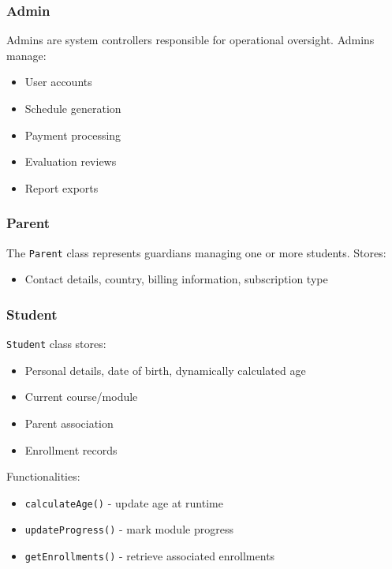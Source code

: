 \subsubsection{Admin}
Admins are system controllers responsible for operational oversight. Admins manage:
\begin{itemize}
    \item User accounts
    \item Schedule generation
    \item Payment processing
    \item Evaluation reviews
    \item Report exports
\end{itemize}

\subsubsection{Parent}
The \texttt{Parent} class represents guardians managing one or more students. Stores:
\begin{itemize}
    \item Contact details, country, billing information, subscription type
\end{itemize}

\subsubsection{Student}
\texttt{Student} class stores:
\begin{itemize}
    \item Personal details, date of birth, dynamically calculated age
    \item Current course/module
    \item Parent association
    \item Enrollment records
\end{itemize}
Functionalities:
\begin{itemize}
    \item \texttt{calculateAge()} - update age at runtime
    \item \texttt{updateProgress()} - mark module progress
    \item \texttt{getEnrollments()} - retrieve associated enrollments
\end{itemize}

